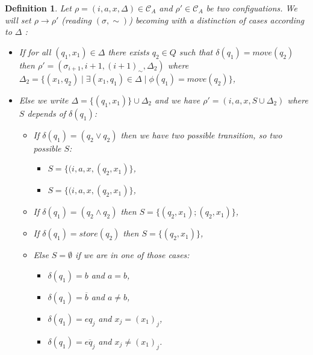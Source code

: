 \documentclass[a4paper,10pt]{report}
\newtheorem{df}{Definition}
\newcommand{\C}{\mathcal{C}_{A}}
\begin{document}
\begin{df}
  Let $\rho = (i,a,x,\Delta) \in \C$ and $\rho' \in \C$ be two configuations.
 We will set  $\rho \rightarrow \rho'$ (reading $(\sigma,\sim)$) becoming with a distinction of cases according to $\Delta$ : 
   \begin{itemize}
    \item [$\rightarrow_M$ (move)] If for all $(q_1,x_1) \in \Delta $ there exists $q_2 \in Q$ such that $\delta(q_1) = move(q_2)$  then $\rho'  = (\sigma_{i+1},i+1,{(i+1)}_\sim,\Delta_2)$ 
    where $\Delta_2 = \{(x_1,q_2) \mid \exists (x_1,q_1) \in \Delta \mid \phi(q_1) = move(q_2)\}$,

    \item [$\rightarrow_{\epsilon}$ (epsilon)  ] Else we write $\Delta = \{(q_1,x_1)\} \cup \Delta_2$ and we have  $\rho' = (i,a,x,S \cup \Delta_2 )$ where $S$ depends of $\delta(q_1)$:  
    \begin{itemize}
    \item [$\rightarrow_\vee$ (or)] If $\delta(q_1) = (q_2 \vee q_2)$  then we have two possible transition, so two possible $S$:
      \begin{itemize}
	\item $S = \{ (i,a,x,(q_2,x_1)\}$,   
	\item $S = \{(i,a,x,(q_2,x_1) \}$,
      \end{itemize}
    \item [$\rightarrow_\wedge$ (and)] If $\delta(q_1) = (q_2 \wedge q_2)$  then $S = \{(q_2,x_1); (q_2,x_1) \} $,
    \item [$\rightarrow_s$ (store)] If $\delta(q_1) = store(q_2)$  then $S =  \{(q_2,x_1)\}$,
 
    \item [$\rightarrow_c$ (check)] Else $S = \emptyset$ if we are in one of those cases:  
	\begin{itemize}
 	 \item $\delta(q_1) = b$ and $ a= b$,
 	 \item $\delta(q_1) = \overline b$ and $ a \neq b$,
 	 \item $\delta(q_1) = eq_j$ and $x_j = {(x_1)}_j$,
 	 \item $\delta(q_1) = \overline{eq_j}$ and $x_j \neq {(x_1)}_j$.
	\end{itemize}
    \end{itemize}
   

    
   \end{itemize}


\end{df}
\end{document}
